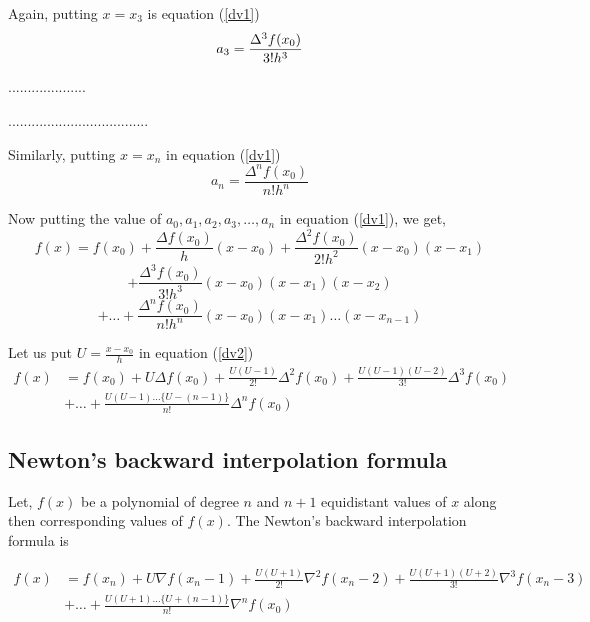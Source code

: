 \documentclass[11pt, a4paper, oneside]{book}
\begin{document}
{{{           Again, putting $x=x_3$ is equation (\ref{dv1})
           \begin{equation*}
             a_3=\frac{\Delta^3f(x_0)}{3!h^3}\\
           \end{equation*}

           ....................

           ....................................


           Similarly, putting $x=x_n$ in equation (\ref{dv1})
           \begin{equation*}
             a_n=\frac{\Delta^nf(x_0)}{n!h^n}
           \end{equation*}

           Now putting the value of $a_0,a_1,a_2,a_3,\dots,a_n$ in equation (\ref{dv1}), we get,
           \begin{equation*}\label{dv2}
             f(x)=f(x_0)+\frac{\Delta f(x_0)}{h}(x-x_0)+\frac{\Delta^2f(x_0)}{2!h^2}(x-x_0)(x-x_1)
           \end{equation*}
           \begin{equation*}\label{dv2}
                 +\frac{\Delta^3f(x_0)}{3!h^3}(x-x_0)(x-x_1)(x-x_2)
           \end{equation*}
           \begin{equation}\label{dv2}
                 +\dots+\frac{\Delta^nf(x_0)}{n!h^n}(x-x_0)(x-x_1)\dots(x-x_{n-1})
           \end{equation}

           Let us put $U=\frac{x-x_0}{h}$ in equation (\ref{dv2})
           \begin{align*}
             f(x)&=f(x_0)+U\Delta f(x_0)+\frac{U(U-1)}{2!}\Delta^2f(x_0)+\frac{U(U-1)(U-2)}{3!}\Delta^3f(x_0)\\
             &+\dots+\frac{U(U-1)\dots\{U-(n-1)\}}{n!}\Delta^nf(x_0)
           \end{align*}}}}

         \subsection{Newton's backward interpolation formula}
           Let, $f(x)$ be a polynomial  of degree $n$ and $n+1$ equidistant values of $x$ along then
           corresponding values of $f(x)$. The Newton's backward interpolation formula is

           \begin{align*}
             f(x) &= f(x_n)+U\nabla f(x_n-1)+\frac{U(U+1)}{2!}\nabla^2f(x_n-2)+\frac{U(U+1)(U+2)}{3!}\nabla^3f(x_n-3)\\
                  &+\dots+\frac{U(U+1)\dots\{U+(n-1)\}}{n!}\nabla^nf(x_0)
           \end{align*}
\end{document}
